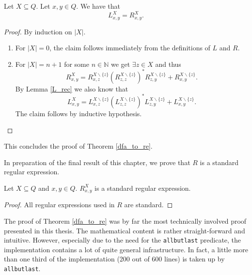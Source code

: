 \begin{lemma}
    \label{L_R}
    Let $X \subseteq Q$. Let $x,y \in Q$. We have that 
    \begin{equation*}
        L^X_{x,y} = R^X_{x,y}.
    \end{equation*}
\end{lemma}
\begin{proof}
    By induction on $|X|$.
    \begin{enumerate}
        \item For $|X| = 0$, the claim follows immediately from the definitions of $L$ and $R$. 
        \item For $|X| = n+1$ for some $n \in \mathbb{N}$ we get $\exists z \in X$ and thus 
            \begin{equation*}
                R^X_{x,y} = R^{X\backslash\{z\}}_{x,z} (R^{X\backslash\{z\}}_{z,z})^* R^{X\backslash\{z\}}_{z,y} 
                + R^{X\backslash\{z\}}_{x,y}.
            \end{equation*}
            By Lemma \ref{L_rec} we also know that 
            \begin{equation*}
                L^X_{x,y} = L^{X\backslash\{z\}}_{x,z} (L^{X\backslash\{z\}}_{z,z})^* L^{X\backslash\{z\}}_{z,y}
                + L^{X\backslash\{z\}}_{x,y}.
            \end{equation*}
            The claim follows by inductive hypothesis.
    \end{enumerate}
\end{proof}


This concludes the proof of Theorem \ref{dfa_to_re}.


In preparation of the final result of this chapter, we prove that $R$ is a standard regular expression.
\begin{lemma}
    \label{R_standard}
        Let $X \subseteq Q$ and $x,y \in Q$. $R^X_{x,y}$ is a standard regular expression.
    \end{lemma}
\begin{proof}
    All regular expressions used in $R$ are standard.
\end{proof}


The proof of Theorem \ref{dfa_to_re} was by far the most technically involved proof presented in this thesis. 
The mathematical content is rather straight-forward and intuitive.
However, especially due to the need for the \lstinline{allbutlast} predicate,
the implementation contains a lot of quite general infrastructure.
In fact, a little more than one third of the implementation (200 out of 600 lines) is taken up by \lstinline{allbutlast}.


